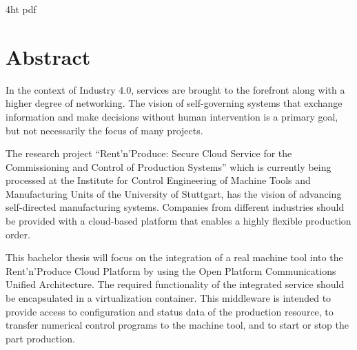\documentclass[
a4paper,
twoside,
headsepline,
cleardoublepage=empty,
parskip=half,
draft=false
]{scrbook}
\begin{document}
	
	\iftex4ht
	\Configure{$}{\PicMath}{\EndPicMath}{}
	{pdf}
	{%
	}
	\fi
	
	
	
	
	
	\Titelblatt
	
	\pagestyle{preamble}
	\renewcommand*{\chapterpagestyle}{preamble}
	
	\section*{Abstract}
	
		In the context of Industry 4.0, services are brought to the forefront along with a higher degree of networking. 
		The vision of self-governing systems that exchange information and make decisions without human intervention is a primary goal, but not necessarily the focus of many projects. 
		
		The research project ``Rent'n'Produce: Secure Cloud Service for the Commissioning and Control of Production Systems'' which is currently being processed at the Institute for Control Engineering of Machine Tools and Manufacturing Units of the University of Stuttgart, has the vision of advancing self-directed manufacturing systems. 
		Companies from different industries should be provided with a cloud-based platform that enables a highly flexible production order. 
		
		This bachelor thesis will focus on the integration of a real machine tool into the Rent'n'Produce Cloud Platform by using the Open Platform Communications Unified Architecture. 
		The required functionality of the integrated service should be encapsulated in a virtualization container. 
		This middleware is intended to provide access to configuration and status data of the production resource, to transfer numerical control programs to the machine tool, and to start or stop the part production.
		
\end{document}
